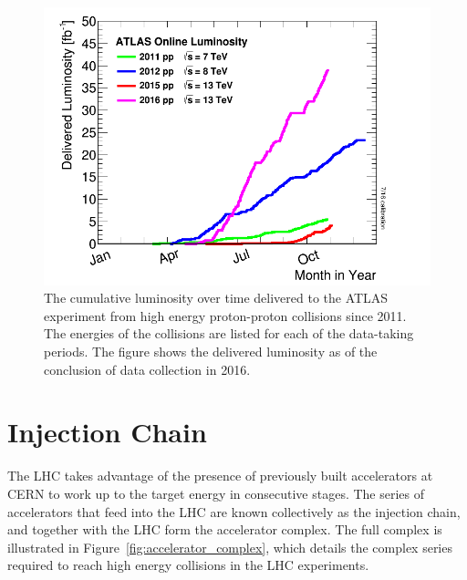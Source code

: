 \begin{figure}
\centering
\includegraphics[width=\fullfig]{figures/lumi_years.png}
\caption{The cumulative luminosity over time delivered to the ATLAS experiment from high energy proton-proton collisions since 2011. The energies of the collisions are listed for each of the data-taking periods. The figure shows the delivered luminosity  as of the conclusion of data collection in 2016.}
\label{fig:lumi_years}
\end{figure}

\section{Injection Chain}
The \ac{LHC} takes advantage of the presence of previously built accelerators at \ac{CERN} to work up to the target energy in consecutive stages.
The series of accelerators that feed into the \ac{LHC} are known collectively as the injection chain, and together with the \ac{LHC} form the accelerator complex.
The full complex is illustrated in Figure~\ref{fig:accelerator_complex}, which details the complex series required to reach high energy collisions in the \ac{LHC} experiments.

